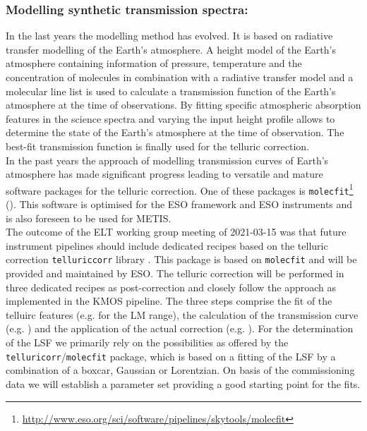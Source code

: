 {%
\subsubsection{Modelling synthetic transmission spectra:}
In the last years the modelling method has evolved. It is based on radiative transfer modelling of the Earth's atmosphere. A height model of the Earth's atmosphere containing information of pressure, temperature and the concentration of molecules in combination with a radiative transfer model and a molecular line list is used to calculate a transmission function of the Earth's atmosphere at the time of observations. By fitting specific atmospheric absorption features in the science spectra and varying the input height profile allows to determine the state of the Earth's atmosphere at the time of observation. The best-fit transmission function is finally used for the telluric correction.\\
In the past years the approach of modelling transmission curves of Earth's atmosphere has made significant progress leading to versatile and mature software packages for the telluric correction. One of these packages is \texttt{molecfit}\footnote{\url{http://www.eso.org/sci/software/pipelines/skytools/molecfit}} (\cite{mf1, mf2, molecfit}). This software is optimised for the ESO framework and ESO instruments and is also foreseen to be used for \ac{METIS}.\\
The outcome of the \ac{ELT} working group meeting of 2021-03-15 was that future instrument pipelines should include dedicated recipes based on the telluric correction \texttt{telluriccorr} library \cite{telluriccorr}. This package is based on \texttt{molecfit} and will be provided and maintained by \ac{ESO}. The telluric correction will be performed in three dedicated recipes as post-correction   and closely follow the approach as implemented in the \ac{KMOS} pipeline. The three steps comprise the fit of the telluirc features (e.g.  for the LM range), the calculation of the transmission curve (e.g. ) and the application of the actual correction (e.g. ). For the determination of the \ac{LSF} we primarily rely on the possibilities as offered by the \texttt{telluricorr}/\texttt{molecfit} package, which is based on a fitting of the \ac{LSF} by a combination of a boxcar, Gaussian or Lorentzian. On basis of the commissioning data we will establish a parameter set providing a good starting point for the fits.\\
}
